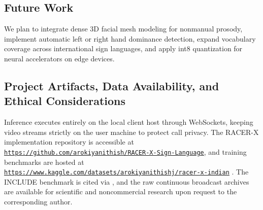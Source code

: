 \documentclass[conference]{IEEEtran}
\begin{document}
\subsection{Future Work}
We plan to integrate dense 3D facial mesh modeling for nonmanual prosody, implement automatic left or right hand dominance detection, expand vocabulary coverage across international sign languages, and apply int8 quantization for neural accelerators on edge devices.


\subsection{Project Artifacts, Data Availability, and Ethical Considerations}
Inference executes entirely on the local client host through WebSockets, keeping video streams strictly on the user machine to protect call privacy. The RACER-X implementation repository is accessible at \href{https://github.com/arokiyanithish/RACER-X-Sign-Language}{\uline{\nolinkurl{https://github.com/arokiyanithish/RACER-X-Sign-Language}}}, and training benchmarks are hosted at \href{https://www.kaggle.com/datasets/arokiyanithishj/racer-x-indian-sign-languages}{\uline{\nolinkurl{https://www.kaggle.com/datasets/arokiyanithishj/racer-x-indian}}} . The INCLUDE benchmark is cited via \cite{b10}, and the raw continuous broadcast archives are available for scientific and noncommercial research upon request to the corresponding author.
\end{document}
